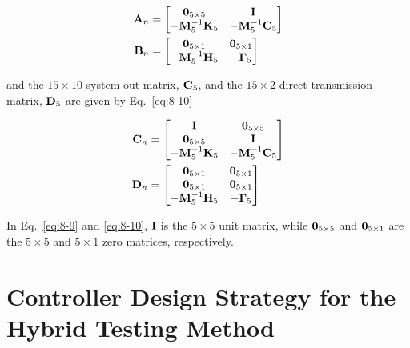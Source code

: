 \begin{equation}\label{eq:8-9}
\begin{aligned}
\mathbf{A}_{n} & = \begin{bmatrix} \mathbf{0}_{5\times5} & \mathbf{I} \\ -\mathbf{M}_{5}^{-1}\mathbf{K}_{5} & -\mathbf{M}_{5}^{-1}\mathbf{C}_{5}\end{bmatrix} \\
\mathbf{B}_{n} & = \begin{bmatrix} \mathbf{0}_{5\times1} & \mathbf{0}_{5\times1} \\ -\mathbf{M}_{5}^{-1}\mathbf{H}_{5} & -\mathbf{\Gamma}_{5} \end{bmatrix}
\end{aligned}
\end{equation}

and the $15\times10$ system out matrix, $\mathbf{C}_{5}$, and the $15\times2$ direct transmission matrix, $\mathbf{D}_{5}$ are given by Eq.~\eqref{eq:8-10}

\begin{equation}\label{eq:8-10}
\begin{aligned}
\mathbf{C}_{n} & = \begin{bmatrix} \mathbf{I} & \mathbf{0}_{5\times5} \\ \mathbf{0}_{5\times5} & \mathbf{I} \\ -\mathbf{M}_{5}^{-1}\mathbf{K}_{5} & -\mathbf{M}_{5}^{-1}\mathbf{C}_{5}\end{bmatrix} \\
\mathbf{D}_{n} & = \begin{bmatrix} \mathbf{0}_{5\times1} & \mathbf{0}_{5\times1} \\ \mathbf{0}_{5\times1} & \mathbf{0}_{5\times1} \\ -\mathbf{M}_{5}^{-1}\mathbf{H}_{5} & -\mathbf{\Gamma}_{5} \end{bmatrix}
\end{aligned}
\end{equation}

In Eq.~\eqref{eq:8-9} and \eqref{eq:8-10}, $\mathbf{I}$ is the $5\times5$ unit matrix, while $\mathbf{0}_{5\times5}$ and $\mathbf{0}_{5\times1}$ are the $5\times5$ and $5\times1$ zero matrices, respectively.

\section{Controller Design Strategy for the Hybrid Testing Method}
